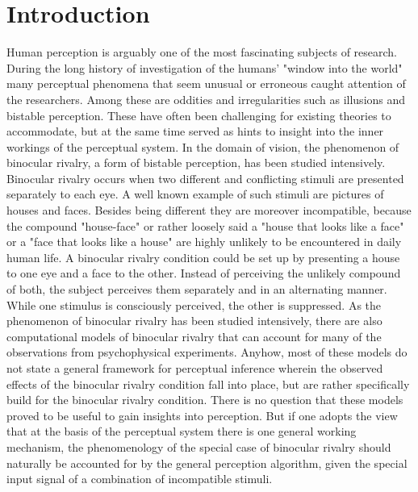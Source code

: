 \documentclass[utf8]{frontiersSCNS} %
\begin{document}
\section{Introduction}

%
%
Human perception is arguably one of the most fascinating subjects of research. During the long history of investigation of the humans' "window into the world" many perceptual phenomena that seem unusual or erroneous caught attention of the researchers. Among these are oddities and irregularities such as illusions and bistable perception. These have often been challenging for existing theories to accommodate, but at the same time served as hints to insight into the inner workings of the perceptual system. In the domain of vision, the phenomenon of  binocular rivalry, a form of bistable perception, has been studied intensively. Binocular rivalry occurs when two different and conflicting stimuli are presented separately to each eye. A well known example of such stimuli are pictures of houses and faces. Besides being different they are moreover incompatible, because the compound "house-face" or rather loosely said a "house that looks like a face" or a "face that looks like a house" are highly unlikely to be encountered in daily human life. A binocular rivalry condition could be set up by presenting a house to one eye and a face to the other. Instead of perceiving the unlikely compound of both, the subject perceives them separately and in an alternating manner. While one stimulus is consciously perceived, the other is suppressed.  
    As the phenomenon of binocular rivalry has been studied intensively, there are also computational models of binocular rivalry that can account for many of the observations from psychophysical experiments. Anyhow, most of these models do not state a general framework for perceptual inference wherein the observed effects of the binocular rivalry condition fall into place, but are rather specifically build for the binocular rivalry condition. There is no question that these models proved to be useful to gain insights into perception. But if one adopts the view that at the basis of the perceptual system there is one general working mechanism, the phenomenology of the special case of binocular rivalry should naturally be accounted for by the general perception algorithm, given the special input signal of a combination of incompatible stimuli. 
    
\end{document}

